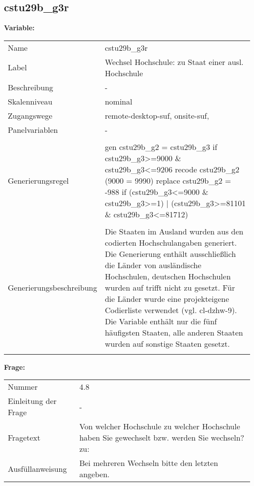 	
	
	\subsection{cstu29b\_g3r}
	\label{subSection:cstu29b_g3r}

	\noindent\textbf{Variable:}\\
		\begin{tabular}{lL{11.3cm}}
			\label{tableVariable:cstu29b_g3r}
			Name & cstu29b\_g3r \\
			Label & Wechsel Hochschule: zu Staat einer ausl. Hochschule \\
			Beschreibung & - \\
			Skalenniveau & nominal \\
			Zugangswege &
				remote-desktop-suf,
				onsite-suf,
 \\
			Panelvariablen & -
			 \\
			 \\
					Generierungsregel & gen cstu29b\_g2 = cstu29b\_g3 if cstu29b\_g3\textgreater{}=9000 \& cstu29b\_g3\textless{}=9206
recode cstu29b\_g2 (9000 = 9990)
replace cstu29b\_g2 = -988 if (cstu29b\_g3\textless{}=9000 \& cstu29b\_g3\textgreater{}=1) | (cstu29b\_g3\textgreater{}=81101 \& cstu29b\_g3\textless{}=81712) \\
				 \\
					Generierungsbeschreibung & Die Staaten im Ausland wurden aus den codierten Hochschulangaben generiert. Die Generierung enthält ausschließlich die Länder von ausländische Hochschulen, deutschen Hochschulen wurden auf trifft nicht zu gesetzt. Für die Länder wurde eine projekteigene Codierliste verwendet (vgl. cl-dzhw-9). Die Variable enthält nur die fünf häufigsten Staaten, alle anderen Staaten wurden auf sonstige Staaten gesetzt. 
				 \\	
			 \\
		\end{tabular}

		\vspace*{1 cm}
		\noindent\textbf{Frage:}\\
		\begin{tabular}{lL{11.3cm}}
			\label{tableQuestion:cstu29b_g3r}
			Nummer & 4.8 \\
			Einleitung der Frage & - \\
			Fragetext & Von welcher Hochschule zu welcher Hochschule haben Sie gewechselt bzw. werden Sie wechseln?
zu: \\
			Ausfüllanweisung & Bei mehreren Wechseln bitte den letzten angeben. \\
		\end{tabular}






